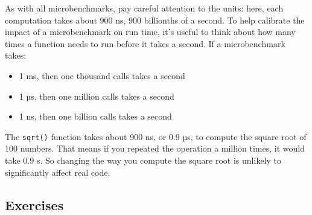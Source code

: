 As with all microbenchmarks, pay careful attention to the units: here,
each computation takes about 900 ns, 900 billionths of a second. To help
calibrate the impact of a microbenchmark on run time, it's useful to
think about how many times a function needs to run before it takes a
second. If a microbenchmark takes:

\begin{itemize}
\tightlist
\item
  1 ms, then one thousand calls takes a second
\item
  1 µs, then one million calls takes a second
\item
  1 ns, then one billion calls takes a second
\end{itemize}

The \texttt{sqrt()} function takes about 900 ns, or 0.9 µs, to compute
the square root of 100 numbers. That means if you repeated the operation
a million times, it would take 0.9 s. So changing the way you compute
the square root is unlikely to significantly affect real code.

\hypertarget{exercises}{%
\subsection{Exercises}\label{exercises}}


